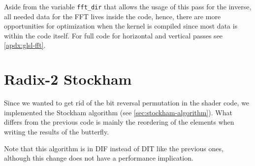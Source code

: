 \documentclass[
  oneside,
  11pt, a4paper,
  footinclude=true,
  headinclude=true,
  cleardoublepage=empty
]{scrbook}
\begin{document}
Aside from the variable \texttt{fft\_dir} that allows the usage of this pass for the inverse, all needed data for the FFT lives inside the code, hence, there are more opportunities for optimization when the kernel is compiled since most data is within the code itself. For full code for horizontal and vertical passes see \autoref{apdx:glsl-fft}.



\section{Radix-2 Stockham} \label{sec:radix2-stockham}

Since we wanted to get rid of the bit reversal permutation in the shader code, we implemented the Stockham algorithm (see \autoref{sec:stockham-algorithm}). What differs from the previous code is mainly the reordering of the elements when writing the results of the butterfly. %

Note that this algorithm is in DIF instead of DIT like the previous ones, although this change does not have a performance implication.
\newline
\end{document}
